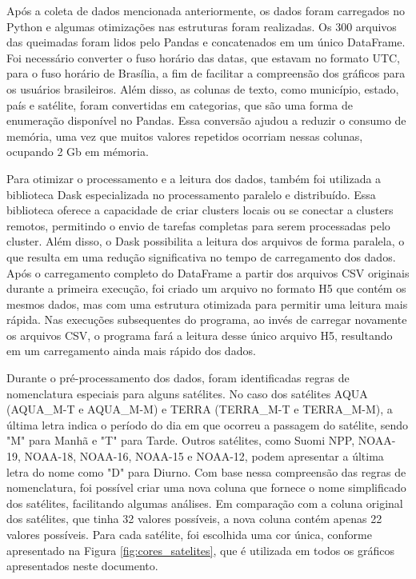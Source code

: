 \documentclass[cic,tc]{iiufrgs}
\begin{document}
Após a coleta de dados mencionada anteriormente, os dados foram carregados no Python e algumas otimizações nas estruturas foram realizadas. Os 300 arquivos das queimadas foram lidos pelo Pandas e concatenados em um único DataFrame. Foi necessário converter o fuso horário das datas, que estavam no formato UTC, para o fuso horário de Brasília, a fim de facilitar a compreensão dos gráficos para os usuários brasileiros. Além disso, as colunas de texto, como município, estado, país e satélite, foram convertidas em categorias, que são uma forma de enumeração disponível no Pandas. Essa conversão ajudou a reduzir o consumo de memória, uma vez que muitos valores repetidos ocorriam nessas colunas, ocupando 2 Gb em mémoria. \par

Para otimizar o processamento e a leitura dos dados, também foi utilizada a biblioteca Dask especializada no processamento paralelo e distribuído. Essa biblioteca oferece a capacidade de criar clusters locais ou se conectar a clusters remotos, permitindo o envio de tarefas completas para serem processadas pelo cluster. Além disso, o Dask possibilita a leitura dos arquivos de forma paralela, o que resulta em uma redução significativa no tempo de carregamento dos dados. Após o carregamento completo do DataFrame a partir dos arquivos CSV originais durante a primeira execução, foi criado um arquivo no formato H5 que contém os mesmos dados, mas com uma estrutura otimizada para permitir uma leitura mais rápida. Nas execuções subsequentes do programa, ao invés de carregar novamente os arquivos CSV, o programa fará a leitura desse único arquivo H5, resultando em um carregamento ainda mais rápido dos dados.  \par

Durante o pré-processamento dos dados, foram identificadas regras de nomenclatura especiais para alguns satélites. No caso dos satélites AQUA (AQUA\_M-T e AQUA\_M-M) e TERRA (TERRA\_M-T e TERRA\_M-M), a última letra indica o período do dia em que ocorreu a passagem do satélite, sendo "M" para Manhã e "T" para Tarde. Outros satélites, como Suomi NPP, NOAA-19, NOAA-18, NOAA-16, NOAA-15 e NOAA-12, podem apresentar a última letra do nome como "D" para Diurno. Com base nessa compreensão das regras de nomenclatura, foi possível criar uma nova coluna que fornece o nome simplificado dos satélites, facilitando algumas análises. Em comparação com a coluna original dos satélites, que tinha 32 valores possíveis, a nova coluna contém apenas 22 valores possíveis. Para cada satélite, foi escolhida uma cor única, conforme apresentado na Figura \ref{fig:cores_satelites}, que é utilizada em todos os gráficos apresentados neste documento. \par
\end{document}
